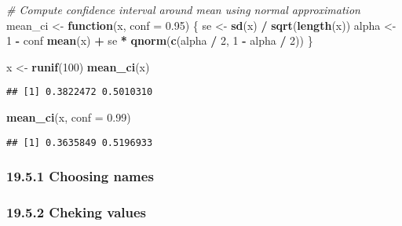 \documentclass[
]{article}
\newenvironment{Shaded}{\begin{snugshade}}{\end{snugshade}}
\newcommand{\AttributeTok}[1]{\textcolor[rgb]{0.13,0.29,0.53}{#1}}
\newcommand{\CommentTok}[1]{\textcolor[rgb]{0.56,0.35,0.01}{\textit{#1}}}
\newcommand{\ControlFlowTok}[1]{\textcolor[rgb]{0.13,0.29,0.53}{\textbf{#1}}}
\newcommand{\DecValTok}[1]{\textcolor[rgb]{0.00,0.00,0.81}{#1}}
\newcommand{\FloatTok}[1]{\textcolor[rgb]{0.00,0.00,0.81}{#1}}
\newcommand{\FunctionTok}[1]{\textcolor[rgb]{0.13,0.29,0.53}{\textbf{#1}}}
\newcommand{\NormalTok}[1]{#1}
\newcommand{\OtherTok}[1]{\textcolor[rgb]{0.56,0.35,0.01}{#1}}
\newcommand{\SpecialCharTok}[1]{\textcolor[rgb]{0.81,0.36,0.00}{\textbf{#1}}}
\begin{document}
\begin{Shaded}
\begin{Highlighting}[]
\CommentTok{\# Compute confidence interval around mean using normal approximation}
\NormalTok{mean\_ci }\OtherTok{\textless{}{-}} \ControlFlowTok{function}\NormalTok{(x, }\AttributeTok{conf =} \FloatTok{0.95}\NormalTok{) \{}
\NormalTok{  se }\OtherTok{\textless{}{-}} \FunctionTok{sd}\NormalTok{(x) }\SpecialCharTok{/} \FunctionTok{sqrt}\NormalTok{(}\FunctionTok{length}\NormalTok{(x))}
\NormalTok{  alpha }\OtherTok{\textless{}{-}} \DecValTok{1} \SpecialCharTok{{-}}\NormalTok{ conf}
  \FunctionTok{mean}\NormalTok{(x) }\SpecialCharTok{+}\NormalTok{ se }\SpecialCharTok{*} \FunctionTok{qnorm}\NormalTok{(}\FunctionTok{c}\NormalTok{(alpha }\SpecialCharTok{/} \DecValTok{2}\NormalTok{, }\DecValTok{1} \SpecialCharTok{{-}}\NormalTok{ alpha }\SpecialCharTok{/} \DecValTok{2}\NormalTok{))}
\NormalTok{\}}

\NormalTok{x }\OtherTok{\textless{}{-}} \FunctionTok{runif}\NormalTok{(}\DecValTok{100}\NormalTok{)}
\FunctionTok{mean\_ci}\NormalTok{(x)}
\end{Highlighting}
\end{Shaded}

\begin{verbatim}
## [1] 0.3822472 0.5010310
\end{verbatim}

\begin{Shaded}
\begin{Highlighting}[]
\FunctionTok{mean\_ci}\NormalTok{(x, }\AttributeTok{conf =} \FloatTok{0.99}\NormalTok{)}
\end{Highlighting}
\end{Shaded}

\begin{verbatim}
## [1] 0.3635849 0.5196933
\end{verbatim}

\hypertarget{choosing-names}{%
\subsubsection{19.5.1 Choosing names}\label{choosing-names}}

\hypertarget{cheking-values}{%
\subsubsection{19.5.2 Cheking values}\label{cheking-values}}
\end{document}
